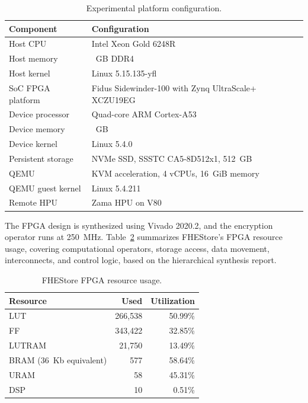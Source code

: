 \documentclass[sigconf,anonymous,balance=false]{acmart}
\newcommand{\bodypar}{\par\vskip 0pt plus 6pt\relax}
\begin{document}
\begin{table}[!htbp]
  \centering
  \caption{Experimental platform configuration.}
  \label{tab:experimental-platform}
  \small
  \renewcommand{\arraystretch}{1.16}
  \begin{tabular}{@{}p{}>{\raggedright\arraybackslash}p{}@{}}
    \toprule
    \textbf{Component} & \textbf{Configuration} \\
    \midrule
    Host CPU & Intel Xeon Gold 6248R \\
    Host memory & 256~GB DDR4 \\
    Host kernel & Linux 5.15.135-yfl \\
    SoC FPGA platform & Fidus Sidewinder-100 with Zynq UltraScale+ XCZU19EG \\
    Device processor & Quad-core ARM Cortex-A53 \\
    Device memory & 16~GB \\
    Device kernel & Linux 5.4.0 \\
    Persistent storage & NVMe SSD, SSSTC CA5-8D512x1, 512~GB \\
    QEMU & KVM acceleration, 4 vCPUs, 16~GiB memory \\
    QEMU guest kernel & Linux 5.4.211 \\
    Remote HPU & Zama HPU on V80 \\
    \bottomrule
  \end{tabular}
\end{table}

The FPGA design is synthesized using Vivado 2020.2, and the encryption operator runs at 250~MHz. Table~\ref{tab:fpga-resources} summarizes FHEStore's FPGA resource usage, covering computational operators, storage access, data movement, interconnects, and control logic, based on the hierarchical synthesis report.
\bodypar

\begin{table}[!htbp]
  \centering
  \caption{FHEStore FPGA resource usage.}
  \label{tab:fpga-resources}
  \small
  \renewcommand{\arraystretch}{1.16}
  \begin{tabular*}{\columnwidth}{@{\extracolsep{\fill}}lrr@{}}
    \toprule
    \textbf{Resource} & \textbf{Used} & \textbf{Utilization} \\
    \midrule
    LUT & 266,538 & 50.99\% \\
    FF & 343,422 & 32.85\% \\
    LUTRAM & 21,750 & 13.49\% \\
    BRAM (36~Kb equivalent) & 577 & 58.64\% \\
    URAM & 58 & 45.31\% \\
    DSP & 10 & 0.51\% \\
    \bottomrule
  \end{tabular*}
\end{table}
\end{document}
